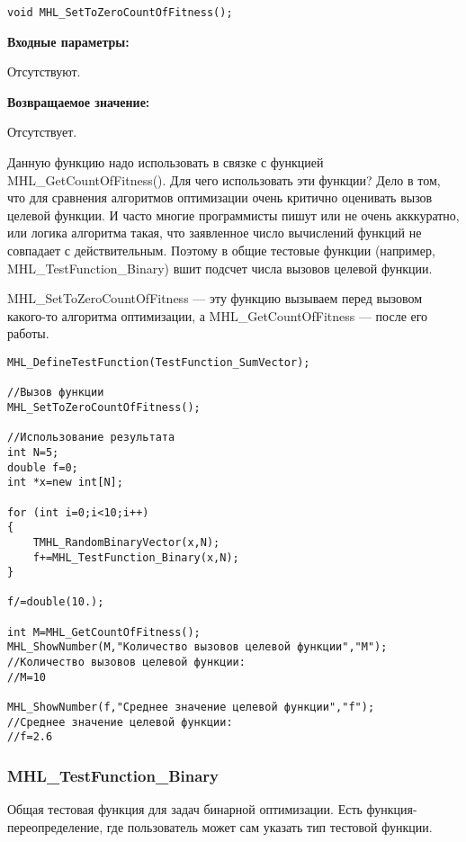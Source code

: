 \documentclass[a4paper,12pt]{article}
\begin{document}
\begin{lstlisting}[label=code_syntax_MHL_SetToZeroCountOfFitness,caption=Синтаксис]
void MHL_SetToZeroCountOfFitness();
\end{lstlisting}

\textbf{Входные параметры:}

Отсутствуют.

\textbf{Возвращаемое значение:}
 
Отсутствует.

Данную функцию надо использовать в связке с функцией MHL\_GetCountOfFitness(). Для чего использовать эти функции? Дело в том, что для сравнения алгоритмов оптимизации очень критично оценивать вызов целевой функции. И часто многие программисты пишут или не очень акккуратно, или логика алгоритма такая, что заявленное число вычислений функций не совпадает с действительным. Поэтому в общие тестовые функции (например, MHL\_TestFunction\_Binary) вшит подсчет числа вызовов целевой функции.

MHL\_SetToZeroCountOfFitness --- эту функцию вызываем перед вызовом какого-то алгоритма оптимизации, а MHL\_GetCountOfFitness --- после его работы.


\begin{lstlisting}[label=code_use_MHL_SetToZeroCountOfFitness,caption=Пример использования]
MHL_DefineTestFunction(TestFunction_SumVector);

//Вызов функции
MHL_SetToZeroCountOfFitness();

//Использование результата
int N=5;
double f=0;
int *x=new int[N];

for (int i=0;i<10;i++)
{
    TMHL_RandomBinaryVector(x,N);
    f+=MHL_TestFunction_Binary(x,N);
}

f/=double(10.);

int M=MHL_GetCountOfFitness();
MHL_ShowNumber(M,"Количество вызовов целевой функции","M");
//Количество вызовов целевой функции:
//M=10

MHL_ShowNumber(f,"Среднее значение целевой функции","f");
//Среднее значение целевой функции:
//f=2.6
\end{lstlisting}

\subsubsection{MHL\_TestFunction\_Binary}\label{MHL_TestFunction_Binary}

Общая тестовая функция для задач бинарной оптимизации. Есть функция-переопределение, где пользователь может сам указать тип тестовой функции.
\end{document}
